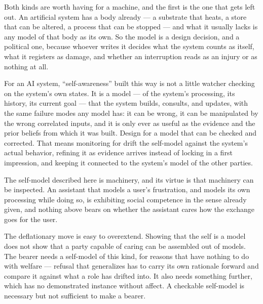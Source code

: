 Both kinds are worth having for a machine, and the first is the one that gets left out. An artificial system has a body already — a substrate that heats, a store that can be altered, a process that can be stopped — and what it usually lacks is any model of that body as its own. So the model is a design decision, and a political one, because whoever writes it decides what the system counts as itself, what it registers as damage, and whether an interruption reads as an injury or as nothing at all.

For an AI system, “self-awareness” built this way is not a little watcher checking on the system's own states. It is a model — of the system's processing, its history, its current goal — that the system builds, consults, and updates, with the same failure modes any model has: it can be wrong, it can be manipulated by the wrong correlated inputs, and it is only ever as useful as the evidence and the prior beliefs from which it was built. Design for a model that can be checked and corrected. That means monitoring for drift the self-model against the system's actual behavior, refining it as evidence arrives instead of locking in a first impression, and keeping it connected to the system's model of the other parties.

The self-model described here is machinery, and its virtue is that machinery can be inspected. An assistant that models a user's frustration, and models its own processing while doing so, is exhibiting social competence in the sense already given, and nothing above bears on whether the assistant cares how the exchange goes for the user.

The deflationary move is easy to overextend. Showing that the self is a model does not show that a party capable of caring can be assembled out of models. The bearer needs a self-model of this kind, for reasons that have nothing to do with welfare — refusal that generalizes has to carry its own rationale forward and compare it against what a role has drifted into. It also needs something further, which has no demonstrated instance without affect. A checkable self-model is necessary but not sufficient to make a bearer.
